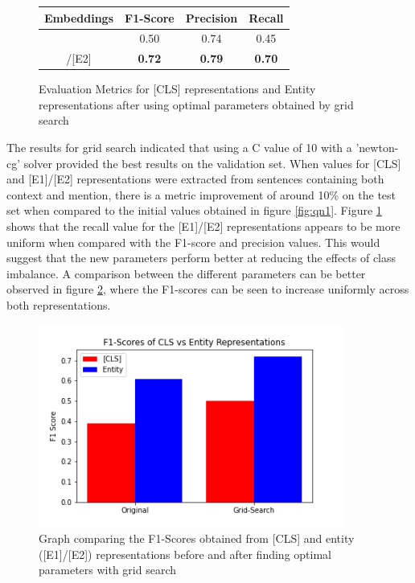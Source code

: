 \documentclass{l4proj}
\begin{document}
\begin{figure}[h]
\begin{center}
\begin{tabular}{||c c c c||} 
 \hline
 Embeddings & F1-Score & Precision & Recall \\ [0.5ex] 
 \hline\hline
 [CLS] & 0.50 & 0.74 & 0.45 \\ 
 \hline
 [E1]/[E2] & \textbf{0.72} & \textbf{0.79} & \textbf{0.70}\\
 \hline
\end{tabular}
\end{center}
\caption{Evaluation Metrics for [CLS] representations and Entity representations after using optimal parameters obtained by grid search}
\label{fig:grid}
\end{figure}

The results for grid search indicated that using a C value of 10 with a 'newton-cg' solver provided the best results on the validation set. When values for [CLS] and [E1]/[E2] representations were extracted from sentences containing both context and mention, there is a metric improvement of around 10\% on the test set when compared to the initial values obtained in figure \ref{fig:qn1}. Figure \ref{fig:grid} shows that the recall value for the [E1]/[E2] representations appears to be more uniform when compared with the F1-score and precision values. This would suggest that the new parameters perform better at reducing the effects of class imbalance. A comparison between the different parameters can be better observed in figure \ref{fig:search}, where the F1-scores can be seen to increase uniformly across both representations. 

\begin{figure}[htb]
    \centering
    \includegraphics[width=10cm]{images/graph.png}
  \caption{Graph comparing the F1-Scores obtained from [CLS] and entity ([E1]/[E2]) representations before and after finding optimal parameters with grid search}
  \label{fig:search}
\end{figure}
\end{document}
